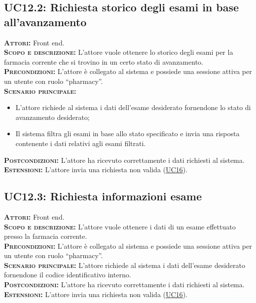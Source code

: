 \subsection{UC12.2: Richiesta storico degli esami in base all'avanzamento}
\label{sec:UC122}
\textsc{\textbf{Attori:}} Front end.\\
\textsc{\textbf{Scopo e descrizione:}} L'attore vuole ottenere lo storico degli esami per la farmacia corrente che si trovino in un certo stato di avanzamento.\\
\textsc{\textsc{\textbf{Precondizioni:}}} L'attore è collegato al sistema e possiede una sessione attiva per un utente con ruolo ``pharmacy''.\\
\textsc{\textsc{\textbf{Scenario principale:}}} 
\begin{itemize}
    \item L'attore richiede al sistema i dati dell'esame desiderato fornendone lo stato di avanzamento desiderato;
    \item Il sistema filtra gli esami in base allo stato specificato e invia una risposta contenente i dati relativi agli esami filtrati.
\end{itemize} 
\textsc{\textbf{Postcondizioni:}} L'attore ha ricevuto correttamente i dati richiesti al sistema.\\
\textsc{\textbf{Estensioni:}} L'attore invia una richiesta non valida (\hyperref[sec:UC16]{UC16}).

\subsection{UC12.3: Richiesta informazioni esame}
\label{sec:UC123}
\textsc{\textbf{Attori:}} Front end.\\
\textsc{\textbf{Scopo e descrizione:}} L'attore vuole ottenere i dati di un esame  effettuato presso la farmacia corrente.\\
\textsc{\textsc{\textbf{Precondizioni:}}} L'attore è collegato al sistema e possiede una sessione attiva per un utente con ruolo ``pharmacy''.\\
\textsc{\textbf{Scenario principale:}} L'attore richiede al sistema i dati dell'esame desiderato fornendone il codice identificativo interno.\\
\textsc{\textbf{Postcondizioni:}} L'attore ha ricevuto correttamente i dati richiesti al sistema.\\
\textsc{\textbf{Estensioni:}} L'attore invia una richiesta non valida (\hyperref[sec:UC16]{UC16}).

